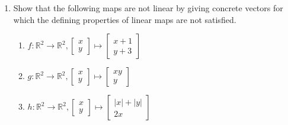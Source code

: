 \documentclass[12pt]{amsart}
\newcommand{\R}{\mathbb{R}}
\begin{document}
\begin{enumerate}
\item
 Show that the following maps are not linear by giving concrete vectors for which the defining properties
 of linear maps are not satisfied.
\begin{enumerate}
\item
 $f: \R^2\to\R^2, \left[\begin{matrix} x \\ y \end{matrix}\right] \mapsto \left[\begin{matrix} x+1 \\ y+3 \end{matrix}\right]$
\item 
 $g: \R^2\to\R^2, \left[\begin{matrix} x \\ y \end{matrix}\right] \mapsto \left[\begin{matrix} xy \\ y \end{matrix}\right]$
\item 
 $h: \R^2\to\R^2, \left[\begin{matrix} x \\ y \end{matrix}\right] \mapsto \left[\begin{matrix} |x|+|y| \\ 2x \end{matrix}\right]$
\end{enumerate}


\end{enumerate}
\end{document}
